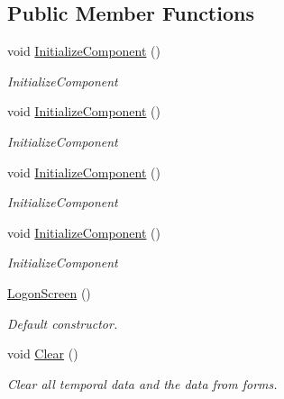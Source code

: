 \subsection*{Public Member Functions}
\begin{DoxyCompactItemize}
\item 
void \mbox{\hyperlink{class_wpf_handler_1_1_u_i_1_1_controls_1_1_logon_1_1_logon_screen_a305abd77b32a115eae52ceba8c369c3d}{Initialize\+Component}} ()
\begin{DoxyCompactList}\small\item\em Initialize\+Component \end{DoxyCompactList}\item 
void \mbox{\hyperlink{class_wpf_handler_1_1_u_i_1_1_controls_1_1_logon_1_1_logon_screen_a305abd77b32a115eae52ceba8c369c3d}{Initialize\+Component}} ()
\begin{DoxyCompactList}\small\item\em Initialize\+Component \end{DoxyCompactList}\item 
void \mbox{\hyperlink{class_wpf_handler_1_1_u_i_1_1_controls_1_1_logon_1_1_logon_screen_a305abd77b32a115eae52ceba8c369c3d}{Initialize\+Component}} ()
\begin{DoxyCompactList}\small\item\em Initialize\+Component \end{DoxyCompactList}\item 
void \mbox{\hyperlink{class_wpf_handler_1_1_u_i_1_1_controls_1_1_logon_1_1_logon_screen_a305abd77b32a115eae52ceba8c369c3d}{Initialize\+Component}} ()
\begin{DoxyCompactList}\small\item\em Initialize\+Component \end{DoxyCompactList}\item 
\mbox{\hyperlink{class_wpf_handler_1_1_u_i_1_1_controls_1_1_logon_1_1_logon_screen_aa74e0f26e834f7bf226796df3ea1bdfa}{Logon\+Screen}} ()
\begin{DoxyCompactList}\small\item\em Default constructor. \end{DoxyCompactList}\item 
void \mbox{\hyperlink{class_wpf_handler_1_1_u_i_1_1_controls_1_1_logon_1_1_logon_screen_aea4275b155b6aa31830e1e492bb881b0}{Clear}} ()
\begin{DoxyCompactList}\small\item\em Clear all temporal data and the data from forms. \end{DoxyCompactList}\end{DoxyCompactItemize}
